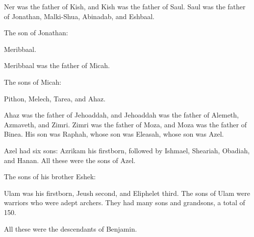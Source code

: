 {\par }{\PP {}Ner
was the father
of Kish,
and Kish
was the father
of Saul.
Saul
was the father
of Jonathan,
Malki-Shua,
Abinadab,
and Eshbaal.
\par }{\PP {}The son
of Jonathan:
\par }{\PP Meribbaal.
\par }{\PP Meribbaal
was the father
of Micah.
\par }{\PP {}The sons
of Micah:
\par }{\PP Pithon,
Melech,
Tarea,
and Ahaz.
\par }{\PP {}Ahaz
was the father of Jehoaddah,
and Jehoaddah
was the father
of Alemeth,
Azmaveth,
and Zimri.
Zimri
was the father
of Moza,
and Moza
was the father
of Binea.
His son was Raphah,
whose son
was Eleasah,
whose son
was Azel.
\par }{\PP {}Azel
had six
sons: Azrikam
his firstborn,
followed by Ishmael,
Sheariah,
Obadiah,
and Hanan.
All
these
were the sons
of Azel.
\par }{\PP {}The sons
of his brother
Eshek:
\par }{\PP Ulam
was his firstborn,
Jeush
second,
and Eliphelet
third.
The sons
of Ulam
were
warriors
who were adept archers.
They had many
sons
and grandsons,
a total of 150.
\par }{\PP All
these
were the descendants
of Benjamin.

}
